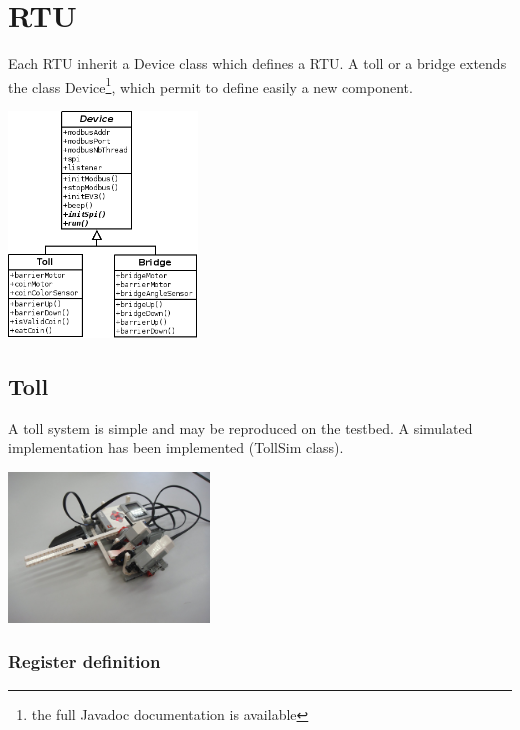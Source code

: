 \documentclass[10pt,a4paper]{article}
\begin{document}
\section{RTU}
	Each RTU inherit a Device class which defines a RTU. A toll or a bridge extends the class Device\footnote{the full Javadoc documentation is available}, which permit to define easily a new component.
	
	\begin{center}
	\includegraphics[height=6cm]{rsrc/Device_class.png}
	\end{center}
		
	\subsection{Toll}
		
		A toll system is simple and may be reproduced on the testbed. A simulated implementation has been implemented (TollSim class).
		
		\begin{center}
		\includegraphics[height=4cm]{rsrc/Toll_01.jpg}
		\end{center}
		
	    \subsubsection{Register definition}
		
\end{document}
